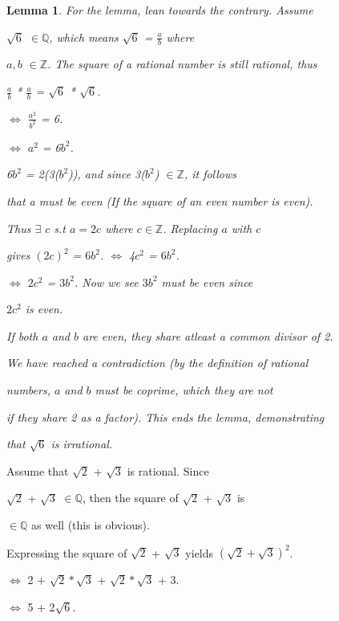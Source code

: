 \documentclass[12pt]{article}
\newcommand{\Q}{\mathbb Q}
\newcommand{\Z}{\mathbb Z}
\newcommand{\ind}{\hspace{10mm}}
\newtheorem{lem}[thm]{Lemma}
\begin{document}
\begin{enumerate}
\begin{lem}
			\ind For the lemma, lean towards the contrary. Assume 
			
			\ind $\sqrt{6}$ $\in \Q$, which means $\sqrt{6}$ = $\frac{a}{b}$ where 
			
			\ind $a,b$ $\in \Z$. The square of a rational number is still rational, thus
			
			\ind $\frac{a}{b}$ * $\frac{a}{b}$ = $\sqrt{6}$ * $\sqrt{6}$.
			
			\ind $\iff$ $\frac{a^2}{b^2}$ = 6.
			
			\ind $\iff$ $a^2$ = 6$b^2$.
			
			\ind 6$b^2$ = 2(3($b^2$)), and since 3($b^2$) $\in \Z$, it follows
			
			\ind that a must be even (If the square of an even number is even).
			
			\ind Thus $\exists$ $c$ s.t $a=2c$ where $c \in \Z$. Replacing $a$ with $c$ 
			
			\ind gives $(2c)^2$ = $6b^2$. $\iff$ 4$c^2$ = $6b^2$. 
			
			\ind $\iff$ $2c^2$ = $3b^2$. Now we see $3b^2$ must be even since 
			
			\ind $2c^2$ is even.
			
			\ind If both $a$ and $b$ are even, they share atleast a common divisor of 2.
			
			\ind We have reached a contradiction (by the definition of rational  
			
			\ind numbers, $a$ and $b$ must be coprime, which they are not 
			
			\ind if they share 2 as a factor). This ends the lemma, demonstrating
			
			\ind that $\sqrt{6}$ is irrational.
 			 
			\end{lem}
			
			
		
			\ind \ind Assume that $\sqrt{2}$ + $\sqrt{3}$ is rational. Since 
			
			\ind \ind $\sqrt{2}$ + $\sqrt{3}$ $\in \Q$, then the square of $\sqrt{2}$ + $\sqrt{3}$ is
			
			\ind \ind $\in \Q$ as well (this is obvious).
			
			\ind \ind Expressing the square of $\sqrt{2}$ + $\sqrt{3}$ yields $(\sqrt{2} + \sqrt{3})^2$.
			
			\ind \ind $\iff$ 2 + $\sqrt{2} * \sqrt{3} $ + $\sqrt{2} * \sqrt{3} $ + 3.
			
			\ind \ind $\iff$ 5 + 2$\sqrt{6}$.
			

\end{enumerate}
\end{document}
